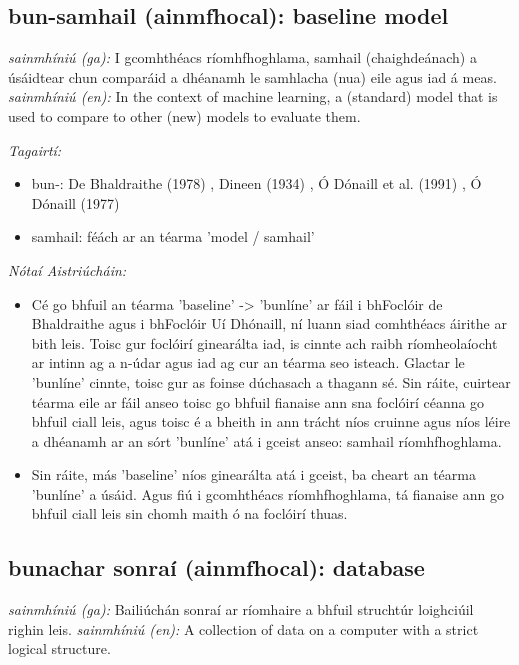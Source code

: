 \documentclass{article}
\begin{document}
\subsection*{bun-samhail (ainmfhocal): baseline model} 
 \noindent \textit{sainmhíniú (ga):} I gcomhthéacs ríomhfhoghlama, samhail (chaighdeánach) a úsáidtear chun comparáid a dhéanamh le samhlacha (nua) eile agus iad á meas.
\newline\newline
 \noindent \textit{sainmhíniú (en):} In the context of machine learning, a (standard) model that is used to compare to other (new) models to evaluate them.
\newline

 \noindent \textit{Tagairtí:}
\begin{itemize}
	\item bun-: De Bhaldraithe (1978) \cite{de-bhaldraithe}, Dineen (1934) \cite{dineen}, Ó Dónaill et al. (1991) \cite{focloir-beag}, Ó Dónaill (1977) \cite{odonaill}
	\item samhail: féách ar an téarma 'model / samhail'
\end{itemize}

 \noindent \textit{Nótaí Aistriúcháin:}
\begin{itemize}
	\item Cé go bhfuil an téarma 'baseline' -> 'bunlíne' ar fáil i bhFoclóir de Bhaldraithe agus i bhFoclóir Uí Dhónaill, ní luann siad comhthéacs áirithe ar bith leis. Toisc gur foclóirí ginearálta iad, is cinnte ach raibh ríomheolaíocht ar intinn ag a n-údar agus iad ag cur an téarma seo isteach. Glactar le 'bunlíne' cinnte, toisc gur as foinse dúchasach a thagann sé. Sin ráite, cuirtear téarma eile ar fáil anseo toisc go bhfuil fianaise ann sna foclóirí céanna go bhfuil ciall leis, agus toisc é a bheith in ann trácht níos cruinne agus níos léire a dhéanamh ar an sórt 'bunlíne' atá i gceist anseo: samhail ríomhfhoghlama.
	\item Sin ráite, más 'baseline' níos ginearálta atá i gceist, ba cheart an téarma 'bunlíne' a úsáid. Agus fiú i gcomhthéacs ríomhfhoghlama, tá fianaise ann go bhfuil ciall leis sin chomh maith ó na foclóirí thuas.
\end{itemize}


\subsection*{bunachar sonraí (ainmfhocal): database} 
 \noindent \textit{sainmhíniú (ga):} Bailiúchán sonraí ar ríomhaire a bhfuil struchtúr loighciúil righin leis.
\newline\newline
 \noindent \textit{sainmhíniú (en):} A collection of data on a computer with a strict logical structure.
\newline
\end{document}
